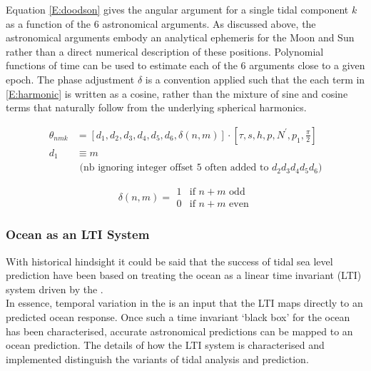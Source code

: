 Equation \ref{E:doodson} gives the angular argument for a single tidal component $k$ as a function of the 6 astronomical arguments.   As discussed above, the astronomical arguments embody an analytical ephemeris for the Moon and Sun rather than a direct numerical description of these positions.  Polynomial functions of time can be used to estimate each of the 6 arguments close to a given epoch.  The phase adjustment $\delta$ is a convention applied such that the each term in \ref{E:harmonic} is written as a cosine, rather than the mixture of sine and cosine terms that naturally follow from the underlying spherical harmonics.

\begin{align}
\label{E:doodson}
\theta_{nmk}  &= \left[ d_1 , d_2 , d_3 , d_4 , d_5 ,d_6 , \delta(n,m)  \right] \cdot \left[ \tau , s  , h , p , N^\prime , p_1 , \frac{\pi}{2}   \right]   \\
          d_1 &\equiv m \nonumber \\
              & \mbox{ (nb ignoring integer offset 5 often added to $d_2d_3d_4d_5d_6$)} \nonumber
\end{align}

\begin{equation}
\delta(n,m)  =     \begin{array}{ll}
                    1 & \mbox{if $n+m$ odd}  \\
                    0 & \mbox{if $n+m$ even} 
                    \end{array}             
\end{equation}


\subsubsection{Ocean as an LTI System}
\label{S:LTI}
With historical hindsight it could be said that the success of tidal sea level prediction have been based on treating the ocean as a linear time invariant (LTI) system driven by the \ATGP{}.\\
In essence, temporal variation in the \ATGP{} is an input that the LTI maps directly to an predicted ocean response.  Once such a time invariant `black box' for the ocean has been characterised,  accurate astronomical predictions can be mapped to an ocean prediction.  The details of how the LTI system is characterised and implemented distinguish the variants of tidal analysis and prediction.\\




